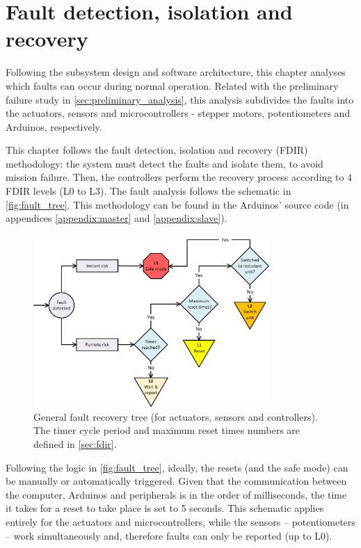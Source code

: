 \section{Fault detection, isolation and recovery}
\label{sec:fdir}

Following the subsystem design and software architecture, this chapter analyses which faults can occur during normal operation. Related with the preliminary failure study in \autoref{sec:preliminary_analysis}, this analysis subdivides the faults into the actuators, sensors and microcontrollers - stepper motors, potentiometers and Arduinos, respectively.

This chapter follows the fault detection, isolation and recovery (FDIR) methodology: the system must detect the faults and isolate them, to avoid mission failure. Then, the controllers perform the recovery process according to 4 FDIR levels (L0 to L3). The fault analysis follows the schematic in \autoref{fig:fault_tree}. This methodology can be found in the Arduinos' source code (in appendices \ref{appendix:master} and \ref{appendix:slave}).


\begin{figure}[H]
    \centering
    \includegraphics[width=0.8\textwidth]{figures/fdir.jpg}
    \caption{General fault recovery tree (for actuators, sensors and controllers). The timer cycle period and maximum reset times numbers are defined in \autoref{sec:fdir}.}
    \label{fig:fault_tree}
\end{figure}

Following the logic in \autoref{fig:fault_tree}, ideally, the resets (and the safe mode) can be manually or automatically triggered. Given that the communication between the computer, Arduinos and peripherals is in the order of milliseconds, the time it takes for a reset to take place is set to 5 seconds. This schematic applies entirely for the actuators and microcontrollers, while the sensors -- potentiometers -- work simultaneously and, therefore faults can only be reported (up to L0). 

